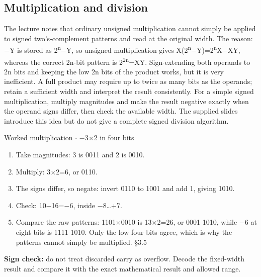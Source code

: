 \documentclass[11pt]{article}
\begin{document}
\begin{keepsection}
\begin{keepsection}
\subsection{Multiplication and division}

The lecture notes that ordinary unsigned multiplication cannot simply be applied to signed two’s-complement patterns and read at the original width. The reason: \ensuremath{-}Y is stored as 2\textsuperscript{n}\ensuremath{-}Y, so unsigned multiplication gives X(2\textsuperscript{n}\ensuremath{-}Y)=2\textsuperscript{n}X\ensuremath{-}XY, whereas the correct 2n-bit pattern is 2\textsuperscript{2n}\ensuremath{-}XY. Sign-extending both operands to 2n bits and keeping the low 2n bits of the product works, but it is very inefficient. A full product may require up to twice as many bits as the operands; retain a sufficient width and interpret the result consistently. For a simple signed multiplication, multiply magnitudes and make the result negative exactly when the operand signs differ, then check the available width. The supplied slides introduce this idea but do not give a complete signed division algorithm.

\begin{workedbox}{Worked multiplication \ensuremath{\cdot} \ensuremath{-}3\ensuremath{\times}2 in four bits}
\begin{enumerate}
\item Take magnitudes: 3 is 0011 and 2 is 0010.
\item Multiply: 3\ensuremath{\times}2=6, or 0110.
\item The signs differ, so negate: invert 0110 to 1001 and add 1, giving 1010.
\item Check: 10\ensuremath{-}16=\ensuremath{-}6, inside \ensuremath{-}8…+7.
\item Compare the raw patterns: 1101\ensuremath{\times}0010 is 13\ensuremath{\times}2=26, or 0001 1010, while \ensuremath{-}6 at eight bits is 1111 1010. Only the low four bits agree, which is why the patterns cannot simply be multiplied. \hfill{\small\color{FAUblue}§3.5}
\end{enumerate}
\end{workedbox}

\begin{notebox}\textbf{Sign check:} do not treat discarded carry as overflow. Decode the fixed-width result and compare it with the exact mathematical result and allowed range.\end{notebox}


\end{keepsection}
\end{keepsection}
\end{document}
